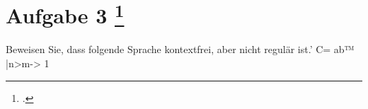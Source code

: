 \documentclass{lehramt-informatik-aufgabe}
\begin{document}
\liAufgabenTitel{}
\section{Aufgabe 3
\footcite{66115:2012:03}}

Beweisen Sie, dass folgende Sprache kontextfrei, aber nicht regulär ist.’
C= {ab™ |n>m-> 1}
\end{document}
